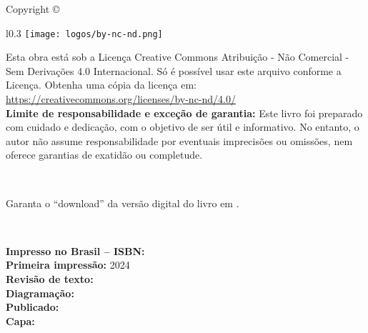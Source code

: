 
\newpage
\thispagestyle{empty}

\noindent Copyright \copyright\ \BookEditionYear\ \BookAuthor %

\begin{wrapfigure}{l}{0.3\textwidth}
\vspace{-10pt}
\texttt{[image: logos/by-nc-nd.png]}
\vspace{-10pt}
\end{wrapfigure}
\noindent Esta obra está sob a Licença Creative Commons Atribuição - Não Comercial - Sem Derivações 4.0 Internacional. 
Só é possível usar este arquivo conforme a Licença. Obtenha uma cópia da licença em:
\url{https://creativecommons.org/licenses/by-nc-nd/4.0/}\\ %


\noindent \textbf{Limite de responsabilidade e exceção de garantia:}
Este livro foi preparado com cuidado e dedicação, 
com o objetivo de ser útil e informativo. 
No entanto, o autor não assume responsabilidade por eventuais imprecisões ou omissões, 
nem oferece garantias de exatidão ou completude.

~

\noindent Garanta o ``download'' da versão digital do livro em \BookLinkHomePage.

~

\noindent \textbf{Impresso no Brasil -- ISBN:} \BookISBN\\ %
\noindent \textbf{Primeira impressão:}  2024\\ %
\noindent \textbf{Revisão de texto:} \BookAuthor\\ %
\noindent \textbf{Diagramação:} \BookAuthor\\ %
\noindent \textbf{Publicado:} \BookPublisher\\ %
\noindent \textbf{Capa:} \BookAuthor %

~


\SetBookAuthorLastName{\BookAuthorLastName}
\SetBookAuthorName{\BookAuthorName}
\SetBookAuthorYearBorn{\BookAuthorBorn}
\SetBookTitle{\BookTitle}
\SetBookSubTitle{\BookSubTitle}
\SetBookPublishingPlace{\BookEditionLocal}
\SetBookPublishingEditor{\BookPublisher}
\SetBookPublishingYear{\BookEditionYear}
\SetBookPaperSize{\BookPaperSizeString}
\SetBookHasBibliography{\BookHasBibliography}
\SetBookISBN{\BookISBN}
\SetBookKeyWordA{\BookKeyWordA}
\SetBookKeyWordB{\BookKeyWordB}
\SetBookKeyWordC{\BookKeyWordC}
\SetBookCDD{\BookCDD}
\SetBookCDU{\BookCDU}

~

\begin{center}
\CatalographicCard{12.5cm}
\end{center}


